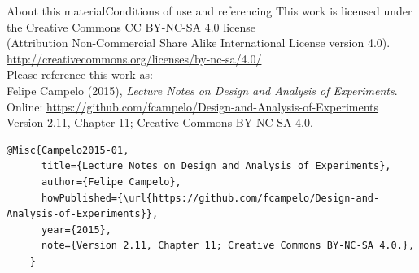 \documentclass[t]{beamer}
\begin{document}

\begin{ftstf}{About this material}{Conditions of use and referencing}
\centering\footnotesize This work is licensed under the Creative Commons CC BY-NC-SA 4.0 license\\(Attribution Non-Commercial Share Alike International License version 4.0).\\
\vhalf
\url{http://creativecommons.org/licenses/by-nc-sa/4.0/}\\
\vone
\footnotesize Please reference this work as:\\
\footnotesize \flushleft Felipe Campelo (2015), \textit{Lecture Notes on Design and Analysis of Experiments}.\\Online: {\scriptsize\url{https://github.com/fcampelo/Design-and-Analysis-of-Experiments}}\\
Version 2.11, Chapter 11; Creative Commons BY-NC-SA 4.0.\\

\begin{Verbatim}[fontsize=\tiny]
    @Misc{Campelo2015-01,
      title={Lecture Notes on Design and Analysis of Experiments},
      author={Felipe Campelo},
      howPublished={\url{https://github.com/fcampelo/Design-and-Analysis-of-Experiments}},
      year={2015},
      note={Version 2.11, Chapter 11; Creative Commons BY-NC-SA 4.0.},
    }
\end{Verbatim}

\end{ftstf}
\end{document}
